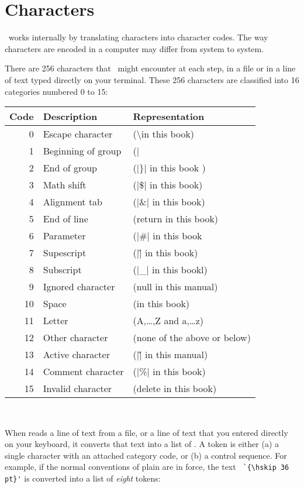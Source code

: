 \chapter{Characters}


\normalsize

\tex\ works internally by translating characters into character codes. The way characters are encoded in a computer
may differ from system to system.


There are 256 characters that \tex\  might encounter at
each step, in a file or in a line of text typed directly on your terminal. These
256 characters are classified into 16 categories numbered 0 to 15:


\arial
\begin{table}[htbp]
\centering
\begin{tabular}{rll}
\toprule
Code & Description & Representation\\
\midrule
0 & Escape character & (\textbackslash in this book)\\
1 & Beginning of group & (|{| in this book)\\
2 & End of group & (|\}| in this book )\\
3 & Math shift & (|\$| in this book)\\
4 & Alignment tab & (|\&| in this book)\\
5 & End of line &(return in this book)\\
6 & Parameter &(|\#| in this book\\
7 & Supescript &(|\^| in this book)\\
8 & Subscript &(|\_| in this bookl)\\
9 & Ignored character &(null in this manual)\\
10 & Space &(\textvisiblespace in this book)\\
11 &Letter &(A,\ldots,Z and a,\ldots z)\\
12 &Other character &(none of the above or below)\\
13 &Active character &(|\~| in this manual)\\
14 &Comment character &(|\%| in this book)\\
15 &Invalid character &(delete in this book)\\
\bottomrule
\end{tabular}
^^A
\end{table}
\medskip

When \tex reads a line of text from a file, or a line of text that you entered
directly on your keyboard, it converts that text into a list of \cmd{\tokens}. A
token is either (a) a single character with an attached category code, or (b) a control
sequence. For example, if the normal conventions of plain \tex  are in force, the text
\verb*+ `{\hskip 36 pt}'+  is converted into a list of \textit{eight} tokens:
\medskip


